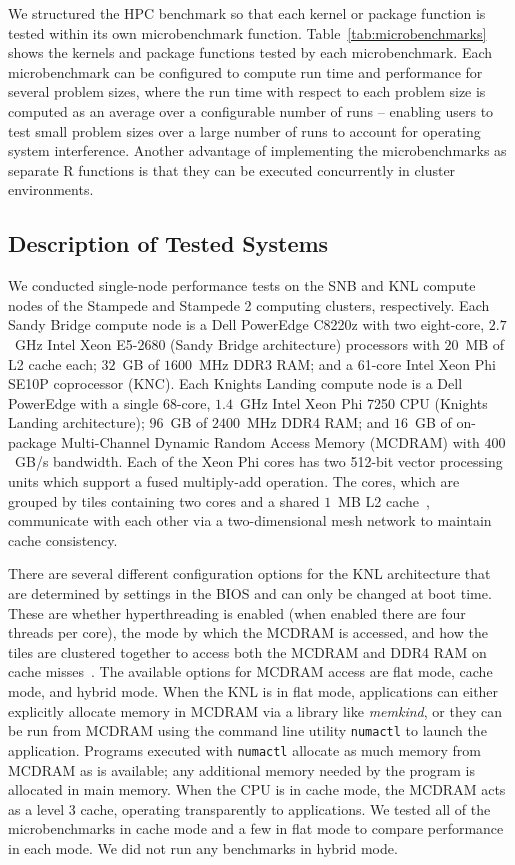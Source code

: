 We structured the HPC benchmark so that each kernel or package function is tested within
its own microbenchmark function. Table~\ref{tab:microbenchmarks} shows the kernels and
package functions tested by each microbenchmark. Each microbenchmark can be configured to
compute run time and performance for several problem sizes, where the run time with
respect to each problem size is computed as an average over a configurable number of runs
-- enabling users to test small problem sizes over a large number of runs to account for
operating system interference. Another advantage of implementing the microbenchmarks as
separate R functions is that they can be executed concurrently in cluster environments.

\subsection{Description of Tested Systems}

We conducted single-node performance tests on the SNB and KNL compute nodes of the
Stampede and Stampede 2 computing clusters, respectively. Each Sandy Bridge compute node
is a Dell PowerEdge C8220z with two eight-core, $2.7$~GHz Intel Xeon E5-2680 (Sandy Bridge
architecture) processors with $20$~MB of L2 cache each; $32$~GB of $1600$~MHz DDR3 RAM;
and a 61-core Intel Xeon Phi SE10P coprocessor (KNC). Each Knights Landing compute node is
a Dell PowerEdge with a single 68-core, $1.4$~GHz Intel Xeon Phi 7250 CPU (Knights Landing
architecture); $96$~GB of $2400$~MHz DDR4 RAM; and $16$~GB of on-package Multi-Channel
Dynamic Random Access Memory (MCDRAM) with $400$~GB/s bandwidth. Each of the Xeon Phi
cores has two 512-bit vector processing units which support a fused multiply-add
operation. The cores, which are grouped by tiles containing two cores and a shared $1$~MB
L2 cache~\cite{intel:xeonphi}, communicate with each other via a two-dimensional mesh
network to maintain cache consistency.

There are several different configuration options for the KNL architecture that are
determined by settings in the BIOS and can only be changed at boot time. These are whether
hyperthreading is enabled (when enabled there are four threads per core), the mode by
which the MCDRAM is accessed, and how the tiles are clustered together to access both the
MCDRAM and DDR4 RAM on cache misses~\cite{vladimirov:knlModes, asai:mcdramKnl}.  The
available options for MCDRAM access are flat mode, cache mode, and hybrid mode.  When the
KNL is in flat mode, applications can either explicitly allocate memory in MCDRAM via a
library like \textit{memkind}, or they can be run from MCDRAM using the command line
utility \texttt{numactl} to launch the application. Programs executed with
\texttt{numactl} allocate as much memory from MCDRAM as is available; any additional
memory needed by the program is allocated in main memory. When the CPU is in cache mode,
the MCDRAM acts as a level 3 cache, operating transparently to applications. We tested all
of the microbenchmarks in cache mode and a few in flat mode to compare performance in each
mode. We did not run any benchmarks in hybrid mode.

